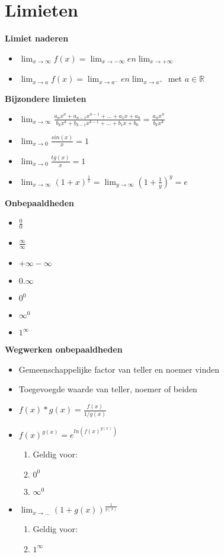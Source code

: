 \documentclass[12pt]{report}
\newcommand{\important}[1] {\textbf{\color{orange}#1}}
\begin{document}
\chapter{Limieten}
\important{Limiet naderen}
\begin{itemize}
 \item $\lim_{x\to\infty} f(x) = \lim_{x\to-\infty} en \lim_{x\to+\infty}$
 \item $\lim_{x\to a} f(x) = \lim_{x\to a^-} en \lim_{x\to a^+}$ met $a \in \mathbb{R}$
\end{itemize}
\important{Bijzondere limieten}
\begin{itemize}
 \item $\lim_{x\to\infty} 
 \frac{a_nx^n + a_{n - 1}x^{n - 1} + ... + a_1x + a_0}{b_kx^k + b_{k - 1}x^{k - 1} + ... + b_1x + b_0}
 = \frac{a_nx^n}{b_kx^k}$
 \item $\lim_{x\to0} \frac{sin(x)}{x} = 1$
 \item $\lim_{x\to0} \frac{tg(x)}{x} = 1$
 \item $\lim_{x\to\infty} (1 + x)^{\frac{1}{x}} = \lim_{y\to\infty}(1 + \frac{1}{y})^y = e$
\end{itemize}
\important{Onbepaaldheden}
\begin{itemize}
 \item $\frac{0}{0}$
 \item $\frac{\infty}{\infty}$
 \item $+ \infty - \infty$
 \item $0 . \infty$
 \item $0^0$
 \item $\infty^0$
 \item $1^\infty$
\end{itemize}
\important{Wegwerken onbepaaldheden}
\begin{itemize}
 \item Gemeenschappelijke factor van teller en noemer vinden
 \item Toegevoegde waarde van teller, noemer of beiden
 \item $f(x) * g(x) = \frac{f(x)}{1/g(x)}$
 \item $f(x)^{g(x)} = e^{ln(f(x)^{g(x)})}$
 \begin{enumerate}[label={}]
     \item Geldig voor:
     \item $0^0$
     \item $\infty^0$
  \end{enumerate}
 \item $\lim_{x\to...} (1 + g(x))^{\frac{1}{g(x)}}$
  \begin{enumerate}[label={}]
       \item Geldig voor:
    \item $1^\infty$
  \end{enumerate}

\end{itemize}
\end{document}
